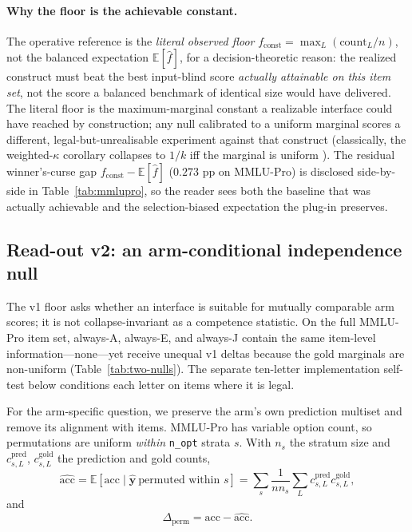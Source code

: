 \paragraph{Why the floor is the achievable constant.}
The operative reference is the \emph{literal observed floor} $f_{\mathrm{const}}=\max_L(\mathrm{count}_L/n)$, not the balanced expectation $\mathbb{E}[\hat f]$, for a decision-theoretic reason: the realized construct must beat the best input-blind score \emph{actually attainable on this item set}, not the score a balanced benchmark of identical size would have delivered. The literal floor is the maximum-marginal constant a realizable interface could have reached by construction; any null calibrated to a uniform marginal scores a different, legal-but-unrealisable experiment against that construct (classically, the weighted-$\kappa$ corollary collapses to $1/k$ iff the marginal is uniform \citep{cohen1960kappa,brennan1981kappa}). The residual winner's-curse gap $f_{\mathrm{const}}-\mathbb{E}[\hat f]$ ($0.273$ pp on MMLU-Pro) is disclosed side-by-side in Table~\ref{tab:mmlupro}, so the reader sees both the baseline that was actually achievable and the selection-biased expectation the plug-in preserves.

\subsection{Read-out v2: an arm-conditional independence null}
\label{sec:v2}

The v1 floor asks whether an interface is suitable for mutually comparable arm scores; it is not collapse-invariant as a competence statistic. On the full MMLU-Pro item set, always-A, always-E, and always-J contain the same item-level information---none---yet receive unequal v1 deltas because the gold marginals are non-uniform (Table~\ref{tab:two-nulls}). The separate ten-letter implementation self-test below conditions each letter on items where it is legal.

For the arm-specific question, we preserve the arm's own prediction multiset and remove its alignment with items. MMLU-Pro has variable option count, so permutations are uniform \emph{within} \texttt{n\_opt} strata $s$. With $n_{s}$ the stratum size and $c^{\mathrm{pred}}_{s,L}$, $c^{\mathrm{gold}}_{s,L}$ the prediction and gold counts,
\begin{equation}
\widehat{\mathrm{acc}}
=\mathbb{E}[\mathrm{acc}\mid \hat{\boldsymbol y}\ \text{permuted within }s]
=\sum_s\frac{1}{n n_{s}}\sum_L c^{\mathrm{pred}}_{s,L}c^{\mathrm{gold}}_{s,L},
\end{equation}
and
\begin{equation}
    \Delta_{\mathrm{perm}}=\mathrm{acc}-\widehat{\mathrm{acc}}.
\end{equation}

